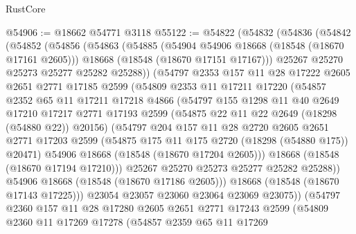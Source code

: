 \begin{lexlean}{RustCore}
\begin{coremodule}
@54906 := @18662 @54771 @3118
@55122 := @54822
    (@54832
      (@54836
        (@54842
          (@54852
            (@54856
              (@54863
                (@54885
                  (@54904 @54906 @18668 (@18548 (@18670 @17161 @2605)))
                  @18668
                  (@18548 (@18670 @17151 @17167)))
                @25267
                @25270
                @25273
                @25277
                @25282
                @25288))
            (@54797
              @2353
              @157
              @11
              @28
              @17222
              @2605
              @2651
              @2771
              @17185
              @2599
              (@54809
                @2353
                @11
                @17211
                @17220
                (@54857
                  @2352
                  @65
                  @11
                  @17211
                  @17218
                  @4866
                  (@54797
                    @155
                    @1298
                    @11
                    @40
                    @2649
                    @17210
                    @17217
                    @2771
                    @17193
                    @2599
                    (@54875 @22 @11 @22 @2649 (@18298 (@54880 @22)) @20156)
                    (@54797
                      @204
                      @157
                      @11
                      @28
                      @2720
                      @2605
                      @2651
                      @2771
                      @17203
                      @2599
                      (@54875 @175 @11 @175 @2720 (@18298 (@54880 @175)) @20471)
                      @54906
                      @18668
                      (@18548 (@18670 @17204 @2605)))
                    @18668
                    (@18548 (@18670 @17194 @17210)))
                  @25267
                  @25270
                  @25273
                  @25277
                  @25282
                  @25288))
              @54906
              @18668
              (@18548 (@18670 @17186 @2605)))
            @18668
            (@18548 (@18670 @17143 @17225)))
          @23054
          @23057
          @23060
          @23064
          @23069
          @23075))
      (@54797
        @2360
        @157
        @11
        @28
        @17280
        @2605
        @2651
        @2771
        @17243
        @2599
        (@54809
          @2360
          @11
          @17269
          @17278
          (@54857
            @2359
            @65
            @11
            @17269

\end{coremodule}
\end{lexlean}
